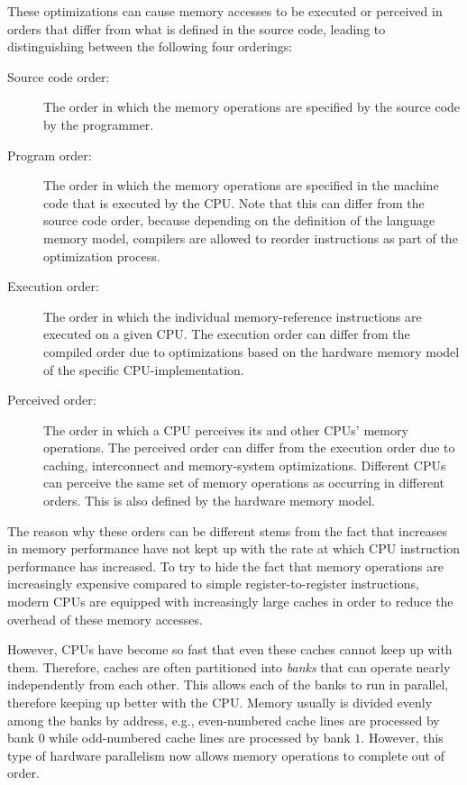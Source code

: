 \documentclass[a4paper,12pt,notitlepage,twoside,openright]{article}
\begin{document}
These optimizations can cause memory accesses to be executed or
perceived in orders that differ from what is defined in the source
code, leading to distinguishing between the following four orderings:
\begin{description}
	\item[Source code order:] The order in which the memory operations
          are specified by the source code by the programmer.
	\item[Program order:] The order in which the memory operations
          are specified in the machine code that is executed by the
          CPU. Note that this can differ from the source code order,
          because depending on the definition of the language memory
          model, compilers are allowed to reorder instructions as
          part of the optimization process.
	\item[Execution order:] The order in which the individual
          memory-reference instructions are executed on a given
          CPU. The execution order can differ from the compiled order
          due to optimizations based on the hardware memory model of
          the specific CPU-implementation.
	\item[Perceived order:] The order in which a CPU perceives its
          and other CPUs' memory operations. The perceived order can
          differ from the execution order due to caching, interconnect
          and memory-system optimizations. Different CPUs can perceive
          the same set of memory operations as occurring in different
          orders. This is also defined by the hardware memory model.
\end{description}

The reason why these orders can be different stems from the fact that
increases in memory performance have not kept up with the rate at
which CPU instruction performance has increased. To try to hide the
fact that memory operations are increasingly expensive compared to
simple register-to-register instructions, modern CPUs are equipped
with increasingly large caches in order to reduce the overhead of
these memory accesses.

However, CPUs have become so fast that even these caches cannot keep
up with them. Therefore, caches are often partitioned into
\emph{banks} that can operate nearly independently from each
other. This allows each of the banks to run in parallel, therefore
keeping up better with the CPU. Memory usually is divided evenly among
the banks by address, e.g., even-numbered cache lines are processed by
bank $0$ while odd-numbered cache lines are processed by bank
$1$. However, this type of hardware parallelism now allows memory
operations to complete out of order.
\end{document}
